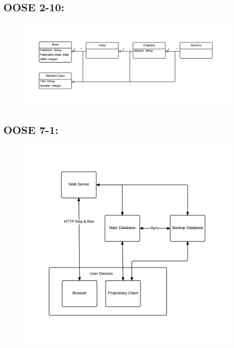\documentclass[11pt,a4paper]{report}
\begin{document}
\subsection{OOSE 2-10:}

\begin{figure}[h!]
    \centering
    \includegraphics[width=1.1\textwidth]{pictures/oose2_10}

    \label{fig:OOSE210}
\end{figure}

\newpage
\subsection{OOSE 7-1:}

\begin{figure}[h!]
    \centering
    \includegraphics[width=1.1\textwidth]{pictures/oose7_1}
    \label{fig:OOSE71}
\end{figure}
\end{document}
